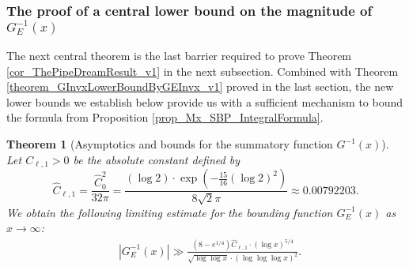 \documentclass[11pt,reqno,a4letter]{article}
\numberwithin{figure}{section}
\numberwithin{table}{section}
\theoremstyle{plain}
\newtheorem{theorem}{Theorem}
\numberwithin{theorem}{section}
\theoremstyle{definition}
\newcommand{\NBRef}[1]{}
\newcommand{\SuccSim}[0]{\overset{_{\scriptsize{\blacktriangle}}}{\succsim}}
\renewcommand{\SuccSim}[0]{\ensuremath{\gg}}
\begin{document}
\subsubsection{The proof of a central lower bound on the magnitude of $G_{E}^{-1}(x)$} 

The next central theorem is the last barrier required to prove 
Theorem \ref{cor_ThePipeDreamResult_v1} 
in the next subsection. 
Combined with Theorem \ref{theorem_GInvxLowerBoundByGEInvx_v1} 
proved in the last section, the new lower bounds we establish below provide us 
with a sufficient mechanism to bound the formula from 
Proposition \ref{prop_Mx_SBP_IntegralFormula}. 

\begin{theorem}[Asymptotics and bounds for the summatory function $G^{-1}(x)$] 
\label{theorem_gInv_GeneralAsymptoticsForms}
Let $C_{\ell,1} > 0$ be the absolute constant defined by 
\[
\widehat{C}_{\ell,1} = \frac{\widehat{C}_0^2}{32\pi} = 
     \frac{(\log 2) \cdot \exp\left(-\frac{15}{16} (\log 2)^2\right)}{8 \sqrt{2} \pi} 
     \approx 0.00792203.  
\]
We obtain the following limiting estimate for the bounding function 
$G_{E}^{-1}(x)$ as $x \rightarrow \infty$: 
\begin{align*} 
 & \left\lvert G_{E}^{-1}\left(x\right) \right\rvert
     \SuccSim 
     \frac{\left(8-e^{1/4}\right) \widehat{C}_{\ell,1} \cdot (\log x)^{5/4}}{ 
     \sqrt{\log\log x} \cdot (\log\log\log x)^2}. 
\end{align*} 
\end{theorem} 
\NBRef{A10-2020.04-26} 
\end{document}
